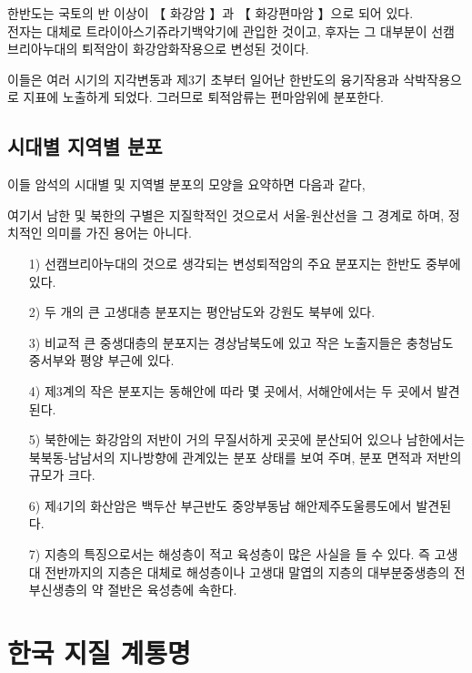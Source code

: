 \documentclass[12pt,a4paper]{book}
\newcommand{\SectionMargin}			{\newpage  \null \vskip 0cm}
\begin{document}
			한반도는 국토의 반 이상이 【 화강암 】과 【 화강편마암 】으로 되어 있다. 
			\\[-1.0em]

			전자는 대체로 트라이아스기쥬라기백악기에 관입한 것이고, 후자는 그 대부분이 선캠브리아누대의 퇴적암이 화강암화작용으로 변성된 것이다.

			이들은 여러 시기의 지각변동과 제3기 초부터 일어난 한반도의 융기작용과 삭박작용으로 지표에 노출하게 되었다.  
			그러므로 퇴적암류는 편마암위에 분포한다.


	\SectionMargin
	\section{	시대별 지역별 분포}


			이들 암석의 시대별 및 지역별 분포의 모양을 요약하면 다음과 같다, 

			여기서 남한 및 북한의 구별은 지질학적인 것으로서 서울-원산선을 그 경계로 하며, 정치적인 의미를 가진 용어는 아니다.

			\begin{enumerate}
			\item[1)] 	선캠브리아누대의 것으로 생각되는 변성퇴적암의 주요 분포지는 한반도 중부에 있다.
			\item[2)] 	두 개의 큰 고생대층 분포지는 평안남도와 강원도 북부에 있다.
			\item[3)] 	비교적 큰 중생대층의 분포지는 경상남북도에 있고 작은 노출지들은 충청남도 중서부와 평양 부근에 있다.
			\item[4)] 	제3계의 작은 분포지는 동해안에 따라 몇 곳에서, 서해안에서는 두 곳에서 발견된다.
			\item[5)] 	북한에는 화강암의 저반이 거의 무질서하게 곳곳에 분산되어 있으나 
						남한에서는 북북동-남남서의 지나방향에 관계있는 분포 상태를 보여 주며, 분포 면적과 저반의 규모가 크다.
			\item[6)] 	제4기의 화산암은 백두산 부근반도 중앙부동남 해안제주도울릉도에서 발견된다.
			\item[7)] 	지층의 특징으로서는 해성층이 적고 육성층이 많은 사실을 들 수 있다. 
						즉 고생대 전반까지의 지층은 대체로 해성층이나 고생대 말엽의 지층의 대부분중생층의 전부신생층의 약 절반은 육성층에 속한다.
			\end{enumerate}




\newpage
\chapter{한국 지질 계통명}
\end{document}
